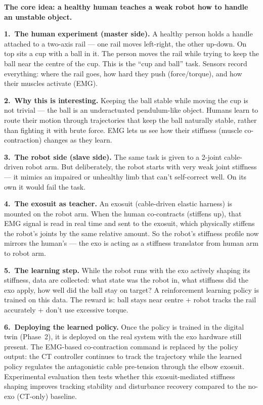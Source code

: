 \documentclass[11pt, a4paper]{article}
\begin{document}
\begin{infobox}
\textbf{The core idea: a healthy human teaches a weak robot how to handle an unstable object.}

\medskip
\textbf{1.\ The human experiment (master side).}
A healthy person holds a handle attached to a two-axis rail --- one rail moves
left-right, the other up-down. On top sits a cup with a ball in it. The person
moves the rail while trying to keep the ball near the centre of the cup. This
is the ``cup and ball'' task. Sensors record everything: where the rail goes,
how hard they push (force/torque), and how their muscles activate (EMG).

\medskip
\textbf{2.\ Why this is interesting.}
Keeping the ball stable while moving the cup is not trivial --- the ball is an
underactuated pendulum-like object. Humans learn to route their motion through
trajectories that keep the ball naturally stable, rather than fighting it with
brute force. EMG lets us see how their stiffness (muscle co-contraction) changes
as they learn.

\medskip
\textbf{3.\ The robot side (slave side).}
The same task is given to a 2-joint cable-driven robot arm. But deliberately,
the robot starts with very weak joint stiffness --- it mimics an impaired or
unhealthy limb that can't self-correct well. On its own it would fail the task.

\medskip
\textbf{4.\ The exosuit as teacher.}
An exosuit (cable-driven elastic harness) is mounted on the robot arm. When the
human co-contracts (stiffens up), that EMG signal is read in real time and sent
to the exosuit, which physically stiffens the robot's joints by the same relative
amount. So the robot's stiffness profile now mirrors the human's --- the exo is
acting as a stiffness translator from human arm to robot arm.

\medskip
\textbf{5.\ The learning step.}
While the robot runs with the exo actively shaping its stiffness, data are
collected: what state was the robot in, what stiffness did the exo apply, how
well did the ball stay on target? A reinforcement learning policy is trained on
this data. The reward is: ball stays near centre + robot tracks the rail
accurately + don't use excessive torque.

\medskip
\textbf{6.\ Deploying the learned policy.}
Once the policy is trained in the digital twin (Phase~2), it is deployed on the
real system with the exo hardware still present. The EMG-based co-contraction
command is replaced by the policy output: the CT controller continues to track
the trajectory while the learned policy regulates the antagonistic cable
pre-tension through the elbow exosuit. Experimental evaluation then tests
whether this exosuit-mediated stiffness shaping improves tracking stability
and disturbance recovery compared to the no-exo (CT-only) baseline.
\end{infobox}
\end{document}
